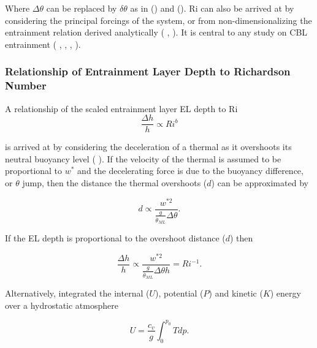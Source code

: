 Where $\Delta \theta$ can be replaced by $\delta \theta$ as in \citeauthor{FedConzMir04} (\citeyear{FedConzMir04}) and \citeauthor{GarciaMellado} (\citeyear{GarciaMellado}).  \acs{Ri} can also be arrived at by considering the principal forcings of the system, or from non-dimensionalizing the entrainment relation  derived analytically (\citeauthor{Tennekes73}  \citeyear{Tennekes73}, \citeauthor{Deardorff72} \citeyear{Deardorff72}). It is central to any study on \acs{CBL} entrainment (\citeauthor{SullMoengStev} \citeyear{SullMoengStev}, \citeauthor{FedConzMir04} \citeyear{FedConzMir04}, \citeauthor{Traum11} \citeyear{Traum11}, \citeauthor{BrooksFowler2} \citeyear{BrooksFowler2}).


\subsubsection{Relationship of Entrainment Layer Depth to Richardson Number}

A relationship of the scaled entrainment layer \acs{EL} depth to \acs{Ri}
\begin{equation}\label{eq:dhvsri}
\frac{\Delta h}{h} \propto Ri ^{b}
\end{equation}

 is arrived at by considering the deceleration of a thermal
as it overshoots its neutral buoyancy level (\citeauthor{StullNelEl} \citeyear{StullNelEl}).  If the velocity of the thermal is assumed to be
proportional to $w^{*}$ and the decelerating force is due to the buoyancy difference, or $\theta$ jump, then the distance the thermal overshoots
($d$) can be approximated by

\begin{equation}
d \propto \frac{w^{*2}}{\frac{g}{\overline{\theta}_{ML}} \Delta \theta}. 
\end{equation} 

If the \acs{EL} depth is proportional to the overshoot distance ($d$) then

\begin{equation}
\frac{\Delta h}{h} \propto \frac{w^{*2}}{\frac{g}{\overline{\theta}_{ML}} \Delta \theta h} = Ri^{-1}. 
\end{equation} 

Alternatively, \citeauthor{Boers89} \citeyear{Boers89} integrated the internal ($U$), potential ($P$) and kinetic ($K$) energy over a hydrostatic atmosphere

\begin{equation}
U = \frac{c_{v}}{g}\int^{p_{0}}_{0}Tdp.
\end{equation}

